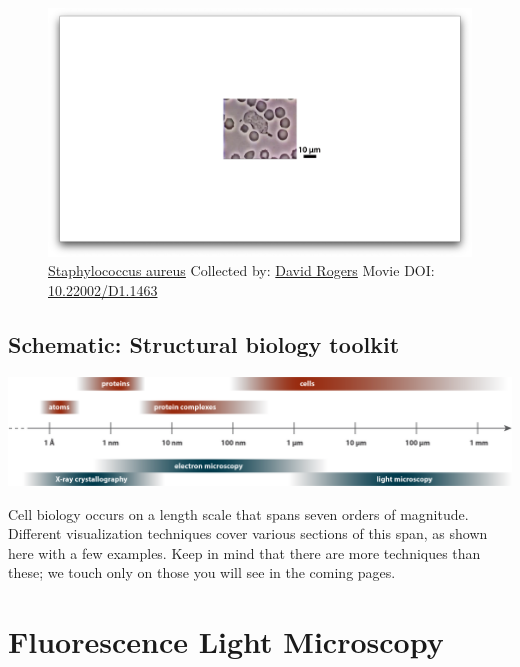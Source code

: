 \documentclass[]{tufte-book}
\begin{document}
\begin{figure}
\includegraphics{movie_stills/1_1} \caption[\protect\hyperlink{tree}{Staphylococcus aureus} Collected by:
\protect\hyperlink{david_rogers}{David Rogers} Movie DOI:
\href{https://doi.org/10.22002/D1.1463}{10.22002/D1.1463}]{\protect\hyperlink{tree}{Staphylococcus aureus} Collected by:
\protect\hyperlink{david_rogers}{David Rogers} Movie DOI:
\href{https://doi.org/10.22002/D1.1463}{10.22002/D1.1463}}\label{fig:1-1}
\end{figure}

\hypertarget{Structural_biology_toolkit}{\subsection*{Schematic:
Structural biology toolkit}\label{Structural_biology_toolkit}}

\includegraphics{img/schematics/1_1_1}

Cell biology occurs on a length scale that spans seven orders of
magnitude. Different visualization techniques cover various sections of
this span, as shown here with a few examples. Keep in mind that there
are more techniques than these; we touch only on those you will see in
the coming pages.

\section{Fluorescence Light
Microscopy}\label{fluorescence-light-microscopy}
\end{document}
